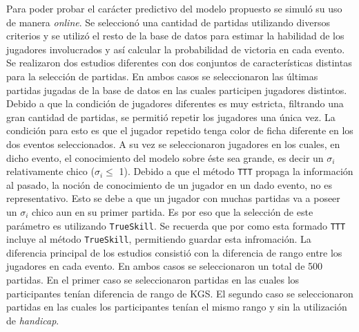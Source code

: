 \documentclass[11pt,twoside,spanish]{report} %
\begin{document}
Para poder probar el car\'acter predictivo del modelo propuesto se simul\'o su uso de manera \textit{online}.
Se seleccion\'o una cantidad de partidas utilizando diversos criterios y se utiliz\'o el resto de la base de datos para estimar la habilidad de los jugadores involucrados y as\'i calcular la probabilidad de victoria en cada evento.
Se realizaron dos estudios diferentes con dos conjuntos de caracter\'isticas distintas para la selecci\'on de  partidas.
En ambos casos se seleccionaron las \'ultimas partidas jugadas de la base de datos en las cuales participen jugadores distintos.
Debido a que la condici\'on de jugadores diferentes es muy estricta, filtrando una gran cantidad de partidas, se permiti\'o repetir los jugadores una \'unica vez.
La condici\'on para esto es que el jugador repetido tenga color de ficha diferente en los dos eventos seleccionados.
A su vez se seleccionaron jugadores en los cuales, en dicho evento, el conocimiento del modelo sobre \'este sea grande, es decir un $\sigma_i$ relativamente chico ($\sigma_i \leq$ 1).
Debido a que el m\'etodo \texttt{TTT} propaga la informaci\'on al pasado, la noci\'on de conocimiento de un jugador en un dado evento, no es representativo.
Esto se debe a que un jugador con muchas partidas va a poseer un $\sigma_i$ chico aun en su primer partida.
Es por eso que la selecci\'on de este par\'ametro es utilizando \texttt{TrueSkill}.
Se recuerda que por como esta formado \texttt{TTT} incluye al m\'etodo \texttt{TrueSkill}, permitiendo guardar esta infromaci\'on.
La diferencia principal de los estudios consisti\'o con la diferencia de rango entre los jugadores en cada evento.
En ambos casos se seleccionaron un total de 500 partidas.
En el primer caso se seleccionaron partidas en las cuales los participantes ten\'ian diferencia de rango de KGS.
El segundo caso se seleccionaron partidas en las cuales los participantes ten\'ian el mismo rango y sin la utilizaci\'on de \textit{handicap}. 
\end{document}
